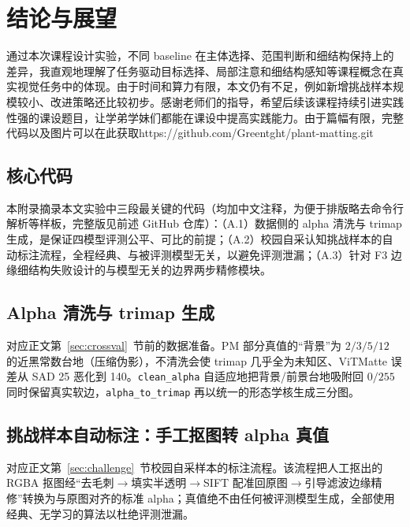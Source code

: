 \documentclass[supercite]{HustGraduPaper}
\begin{document}
	\section{结论与展望}
    通过本次课程设计实验，不同 baseline 在主体选择、范围判断和细结构保持上的差异，我直观地理解了任务驱动目标选择、局部注意和细结构感知等课程概念在真实视觉任务中的体现。由于时间和算力有限，本文仍有不足，例如新增挑战样本规模较小、改进策略还比较初步。感谢老师们的指导，希望后续该课程持续引进实践性强的课设题目，让学弟学妹们都能在课设中提高实践能力。由于篇幅有限，完整代码以及图片可以在此获取https://github.com/Greentght/plant-matting.git
	

	\begin{appendices}
	\section{核心代码}\label{app:code}
	本附录摘录本文实验中三段最关键的代码（均加中文注释，为便于排版略去命令行解析等样板，完整版见前述 GitHub 仓库）：（A.1）数据侧的 alpha 清洗与 trimap 生成，是保证四模型评测公平、可比的前提；（A.2）校园自采认知挑战样本的自动标注流程，全程经典、与被评测模型无关，以避免评测泄漏；（A.3）针对 F3 边缘细结构失败设计的与模型无关的边界两步精修模块。

	\subsection{Alpha 清洗与 trimap 生成}
	对应正文第~\ref{sec:crossval}~节前的数据准备。PM 部分真值的“背景”为 $2/3/5/12$ 的近黑常数台地（压缩伪影），不清洗会使 trimap 几乎全为未知区、ViTMatte 误差从 SAD 25 恶化到 140。\texttt{clean\_alpha} 自适应地把背景/前景台地吸附回 $0/255$ 同时保留真实软边，\texttt{alpha\_to\_trimap} 再以统一的形态学核生成三分图。
	

	\subsection{挑战样本自动标注：手工抠图转 alpha 真值}
	对应正文第~\ref{sec:challenge}~节校园自采样本的标注流程。该流程把人工抠出的 RGBA 抠图经“去毛刺$\to$填实半透明$\to$SIFT 配准回原图$\to$引导滤波边缘精修”转换为与原图对齐的标准 alpha；真值绝不由任何被评测模型生成，全部使用经典、无学习的算法以杜绝评测泄漏。
	


\end{appendices}
\end{document}
